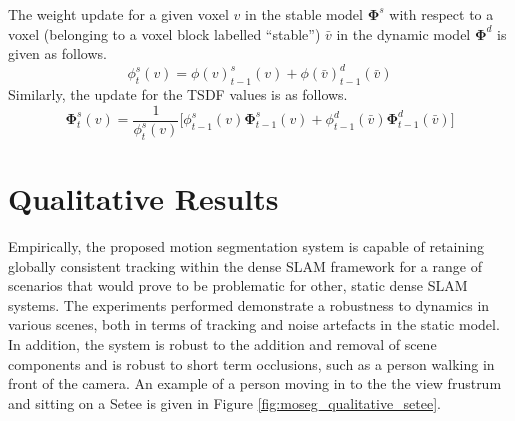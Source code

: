 The weight update for a given voxel $v$ in the stable model $\mathbf{\Phi}^{s}$
with respect to a voxel (belonging to a voxel block labelled ``stable'') 
$\bar{v}$ in the dynamic model $\mathbf{\Phi}^{d}$ is given as follows.
\begin{equation}
  \label{eqn:moseg_weight_update}
  \phi^{s}_{t}(v) = \phi(v)^{s}_{t-1}(v) + \phi(\bar{v})^{d}_{t-1}(\bar{v})
\end{equation}
Similarly, the update for the TSDF values is as follows.
\begin{equation}
  \label{eqn:moseg_sdf_update}
  \mathbf{\Phi}^{s}_{t}(v) = \frac{1}{\phi^{s}_{t}(v)} \bigg[
  \phi^{s}_{t-1}(v) \mathbf{\Phi}^{s}_{t-1}(v) +
  \phi^{d}_{t-1}(\bar{v}) \mathbf{\Phi}^{d}_{t-1}(\bar{v})
  \bigg]
\end{equation}

\section{Qualitative Results}
\label{sec:moseg_qualitative}
Empirically, the proposed motion segmentation system is capable of retaining
globally consistent tracking within the dense SLAM framework for a range of
scenarios that would prove to be problematic for other, static dense SLAM
systems. The experiments performed demonstrate a robustness	to dynamics in
various scenes, both in terms of tracking and noise artefacts in the static
model. In addition, the system is robust to the addition and removal of scene
components and is robust to short term occlusions, such as a person walking in
front of the camera. An example of a person moving in to the the view frustrum
and sitting on a Setee is given in Figure \ref{fig:moseg_qualitative_setee}.

